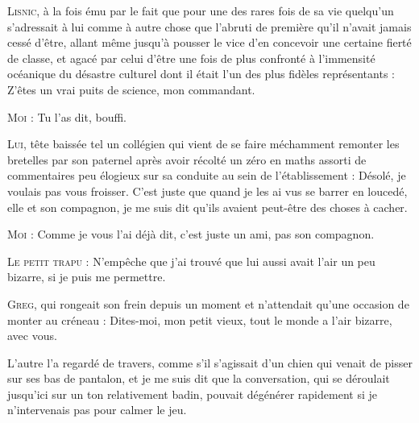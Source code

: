 \begin{dialogue}
\textsc{Lisnic}, à la fois ému par le fait que pour une des rares fois de sa vie quelqu’un s’adressait à lui comme à autre chose que l’abruti de première qu’il n’avait jamais cessé d’être, allant même jusqu’à pousser le vice d’en concevoir une certaine fierté de classe, et agacé par celui d’être une fois de plus confronté à l’immensité océanique du désastre culturel dont il était l’un des plus fidèles représentants : Z’êtes un vrai puits de science, mon commandant.

\textsc{Moi} : Tu l’as dit, bouffi.

\textsc{Lui}, tête baissée tel un collégien qui vient de se faire méchamment remonter les bretelles par son paternel après avoir récolté un zéro en maths assorti de commentaires peu élogieux sur sa conduite au sein de l’établissement : Désolé, je voulais pas vous froisser. C’est juste que quand je les ai vus se barrer en loucedé, elle et son compagnon, je me suis dit qu’ils avaient peut-être des choses à cacher.

\textsc{Moi} : Comme je vous l’ai déjà dit, c’est juste un ami, pas son compagnon.

\textsc{Le petit trapu} : N’empêche que j’ai trouvé que lui aussi avait l’air un peu bizarre, si je puis me permettre.

\textsc{Greg}, qui rongeait son frein depuis un moment et n’attendait qu’une occasion de monter au créneau : Dites-moi, mon petit vieux, tout le monde a l’air bizarre, avec vous.

\end{dialogue}

L’autre l’a regardé de travers, comme s’il s’agissait d’un chien qui venait de pisser sur ses bas de pantalon, et je me suis dit que la conversation, qui se déroulait jusqu’ici sur un ton relativement badin, pouvait dégénérer rapidement si je n’intervenais pas pour calmer le jeu.

